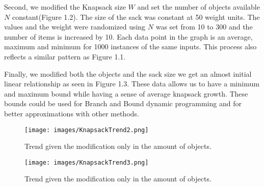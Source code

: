 \documentclass{iitthesis}
\begin{document}
 Second, we modified the Knapsack size $W$ and set the number of objects available $N$ constant(Figure 1.2). The size of the sack was constant at 50 weight units. The values and the weight were randomized using $N$ was set from 10 to 300 and the number of items is increased by 10. Each data point in the graph is an average, maximum and minimum for 1000 instances of the same inputs. This process also reflects a similar pattern as Figure 1.1. 
 
 Finally, we modified both the objects and the sack size we get an almost initial linear relationship as seen in Figure 1.3. These data allows us to have a minimum and maximum bound while having a sense of average knapsack growth. These bounds could be used for Branch and Bound dynamic programming and for better approximations with other methods. 
 

\begin{figure}
    \centering
    \texttt{[image: images/KnapsackTrend2.png]}
    \caption{Trend given the modification only in the amount of objects.}
    \label{fig:trend2}
\end{figure}



\begin{figure}
    \centering
    \texttt{[image: images/KnapsackTrend3.png]}
    \caption{Trend given the modification only in the amount of objects.}
    \label{fig:trend3}
\end{figure}


\newpage
\end{document}
